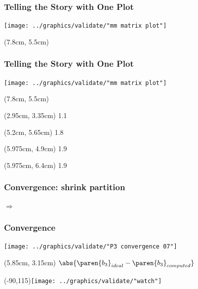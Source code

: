 \documentclass[handout]{beamer}
\begin{document}
\begin{frame}
  \frametitle{Telling the Story with One Plot}  %
  \centering
  \texttt{[image: ../graphics/validate/"mm matrix plot"]}
  \begin{textblock*}{5cm}(7.8cm, 5.5cm)%
  \end{textblock*}
\end{frame}

\begin{frame}
  \frametitle{Telling the Story with One Plot}  %
  \centering
  \texttt{[image: ../graphics/validate/"mm matrix plot"]}
  \begin{textblock*}{5cm}(7.8cm, 5.5cm)%
  \end{textblock*}
  \begin{textblock*}{4cm}(2.95cm, 3.35cm)%
     1.1
  \end{textblock*}
  \begin{textblock*}{4cm}(5.2cm, 5.65cm)%
     1.8
  \end{textblock*}
  \begin{textblock*}{4cm}(5.975cm, 4.9cm)%
     1.9
  \end{textblock*}
  \begin{textblock*}{4cm}(5.975cm, 6.4cm)%
     1.9
  \end{textblock*}
\end{frame}

\begin{frame}
  \frametitle{Convergence: shrink partition}  %
   \quad
  $\Rightarrow$  \quad
\end{frame}

\begin{frame}
  \frametitle{Convergence}  %
  \centering
  \texttt{[image: ../graphics/validate/"P3 convergence 07"]}
  \begin{textblock*}{5cm}(5.85cm, 3.15cm)%
     $\abs{\paren{b_{3}}_{ideal} - \paren{b_{3}}_{computed}}$
  \end{textblock*}
  \Put(-90,115){\texttt{[image: ../graphics/validate/"watch"]}}
\end{frame}

\end{document}
